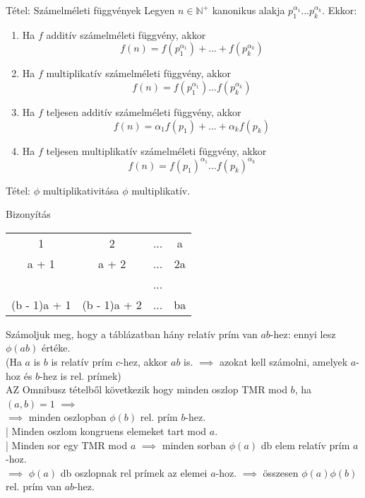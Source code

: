 \documentclass{beamer}
\begin{document}
\begin{frame}

\begin{block}{Tétel: Számelméleti függvények}
Legyen $n \in \mathbb{N}^+$ kanonikus alakja $p_1^{{\alpha}_1}...p_k^{{\alpha}_k}$. Ekkor:\\
\begin{enumerate}
\item Ha $f$ additív számelméleti függvény, akkor $$f(n) = f(p_1^{{\alpha}_1}) + ... + f(p_k^{{\alpha}_k})$$
\item Ha $f$ multiplikatív számelméleti függvény, akkor $$f(n) = f(p_1^{{\alpha}_1})...f(p_k^{{\alpha}_k})$$
\item Ha $f$ teljesen additív számelméleti függvény, akkor $$f(n) = {\alpha}_1f(p_1) + ... + {\alpha}_kf(p_k)$$
\item Ha $f$ teljesen multiplikatív számelméleti függvény, akkor $$f(n) = f(p_1)^{{\alpha}_1}...f(p_k)^{{\alpha}_k}$$
\end{enumerate}

\end{block}

\end{frame}

\begin{frame}

\begin{block}{Tétel: $\phi$ multiplikativitása}
$\phi$ multiplikatív.
\end{block}

\begin{block}{Bizonyítás}
\smallskip
\begin{tabular}{c c c c}
1 & 2 & ... & a \\
a + 1 & a + 2 & ... & 2a\\
 &  & ... &  \\
(b - 1)a + 1 & (b - 1)a + 2 & ... & ba
\end{tabular}
\smallskip
Számoljuk meg, hogy a táblázatban hány relatív prím van $ab$-hez: ennyi lesz ${\phi}(ab)$ értéke.\\
(Ha $a$ is $b$ is relatív prím $c$-hez, akkor $ab$ is. $\implies$ azokat kell számolni, amelyek $a$-hoz és $b$-hez is rel. prímek)\\
\smallskip
AZ Omnibusz tételből következik hogy minden oszlop TMR mod $b$, ha $(a, b) = 1$ $\implies$\\
$\implies$ minden oszlopban ${\phi}(b)$ rel. prím $b$-hez.\\
\smallskip
| Minden oszlom kongruens elemeket tart mod $a$.\\
| Minden sor egy TMR mod $a$ $\implies$ minden sorban ${\phi}(a)$ db elem relatív prím $a$-hoz.\\
$\implies$ ${\phi}(a)$ db oszlopnak rel prímek az elemei $a$-hoz. $\implies$ összesen ${\phi}(a){\phi}(b)$ rel. prím van $ab$-hez.

\end{block}

\end{frame}
\end{document}
